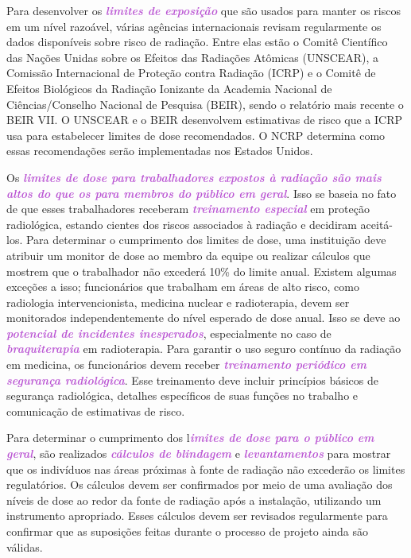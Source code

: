 \documentclass[11pt,a4paper]{article}
\begin{document}
	Para desenvolver os \textcolor{MediumOrchid}{\textbf{\textit{limites de exposição}}} que são usados para manter os riscos em um nível razoável, várias agências internacionais revisam regularmente os dados disponíveis sobre risco de radiação. Entre elas estão o Comitê Científico das Nações Unidas sobre os Efeitos das Radiações Atômicas (UNSCEAR), a Comissão Internacional de Proteção contra Radiação (ICRP) e o Comitê de Efeitos Biológicos da Radiação Ionizante da Academia Nacional de Ciências/Conselho Nacional de Pesquisa (BEIR), sendo o relatório mais recente o BEIR VII. O UNSCEAR e o BEIR desenvolvem estimativas de risco que a ICRP usa para estabelecer limites de dose recomendados. O NCRP determina como essas recomendações serão implementadas nos Estados Unidos.

	Os \textcolor{MediumOrchid}{\textbf{\textit{limites de dose para trabalhadores expostos à radiação são mais altos do que os para membros do público em geral}}}. Isso se baseia no fato de que esses trabalhadores receberam \textcolor{MediumOrchid}{\textbf{\textit{treinamento especial}}} em proteção radiológica, estando cientes dos riscos associados à radiação e decidiram aceitá-los. Para determinar o cumprimento dos limites de dose, uma instituição deve atribuir um monitor de dose ao membro da equipe ou realizar cálculos que mostrem que o trabalhador não excederá 10\% do limite anual. Existem algumas exceções a isso; funcionários que trabalham em áreas de alto risco, como radiologia intervencionista, medicina nuclear e radioterapia, devem ser monitorados independentemente do nível esperado de dose anual. Isso se deve ao \textcolor{MediumOrchid}{\textbf{\textit{potencial de incidentes inesperados}}}, especialmente no caso de \textcolor{MediumOrchid}{\textbf{\textit{braquiterapia}}} em radioterapia. Para garantir o uso seguro contínuo da radiação em medicina, os funcionários devem receber \textcolor{MediumOrchid}{\textbf{\textit{treinamento periódico em segurança radiológica}}}. Esse treinamento deve incluir princípios básicos de segurança radiológica, detalhes específicos de suas funções no trabalho e comunicação de estimativas de risco.

	Para determinar o cumprimento dos l\textcolor{MediumOrchid}{\textbf{\textit{imites de dose para o público em geral}}}, são realizados \textcolor{MediumOrchid}{\textbf{\textit{cálculos de blindagem}}} e \textcolor{MediumOrchid}{\textbf{\textit{levantamentos}}} para mostrar que os indivíduos nas áreas próximas à fonte de radiação não excederão os limites regulatórios. Os cálculos devem ser confirmados por meio de uma avaliação dos níveis de dose ao redor da fonte de radiação após a instalação, utilizando um instrumento apropriado. Esses cálculos devem ser revisados regularmente para confirmar que as suposições feitas durante o processo de projeto ainda são válidas.
\end{document}
